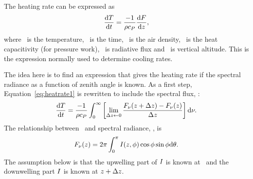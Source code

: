  The heating rate can be expressed as
 \begin{equation}
  \label{eq:heatrate1}
  \frac{\mathrm{d}T}{\mathrm{d}t} = 
         \frac{-1}{\rho c_{P}} \frac{\mathrm{d} F}{\mathrm{d}z},
 \end{equation}
 where \temperature\ is the temperature, \timesymbol\ is the time,
 \density\ is the air density, \heatcapacity\ is the heat capacitivity
 (for pressure work), \flux\ is radiative flux and \altitude\ is
 vertical altitude. This is the expression normally used to determine
 cooling rates.
 
 The idea here is to find an expression that gives the heating rate if
 the spectral radiance as a function of zenith angle is known.  As a
 first step, Equation~\ref{eq:heatrate1} is rewritten to include the
 spectral flux, \monoflux:
 \begin{equation}
  \label{eq:heatrate2}
  \frac{\mathrm{d}T}{\mathrm{d}t} = 
       \frac{-1}{\rho c_{P}} \int_0^\infty \left[
       \lim_{\Delta z\gets 0}\frac{F_{\nu}(z+\Delta z)-
                F_{\nu}(z)}{\Delta z} \right] \mathrm{d}\nu.
 \end{equation}
  The relationship between \monoflux\ and spectral radiance,
  \mpbi, is
 \begin{equation}
  F_{\nu}(z) = 2\pi\int_0^\pi I(z,\phi)
          \cos\phi \sin\phi \mathrm{d}\theta.
 \end{equation}
 The assumption below is that the upwelling part of $I$ is
 known at \altitude\, and the downwelling part $I$ is known at
 $z+\Delta z$.

